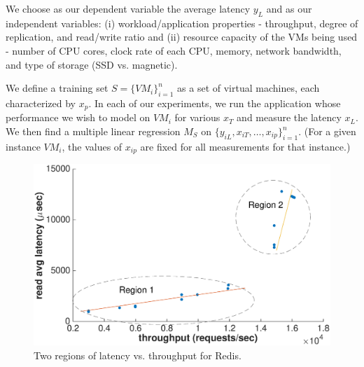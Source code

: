
We choose as our dependent variable the average latency $y_{L}$ and as our independent variables: (i) workload/application properties - throughput, degree of replication, and read/write ratio and (ii) resource capacity of the VMs being used - number of CPU cores, clock rate of each CPU, memory, network bandwidth, and type of storage (SSD vs. magnetic). 


We define a training set $S = \{VM_i\}^n_{i=1}$ as a set of virtual machines, each characterized by $x_p$.  In each of our experiments, we run the application whose performance we wish to model on  $VM_i$ for various $x_{T}$ and measure the latency $x_{L}$.  We then find a multiple linear regression $M_S$ on $\{y_{iL},x_{iT},\ldots,x_{ip}\}^n_{i=1}$.  (For a given instance $VM_i$, the values of $x_{ip}$ are fixed for all measurements for that instance.) 


\begin{figure}
    \centering
    \includegraphics[scale = 0.35]{two_regions.eps}
    \caption{Two regions of latency vs. throughput for Redis. }
    \label{figure:combined}
\end{figure}




